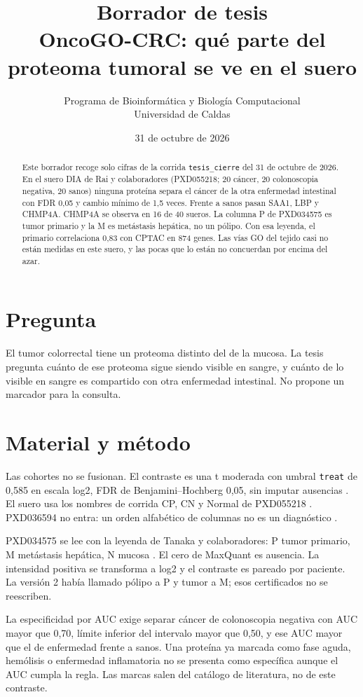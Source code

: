 \documentclass[11pt]{article}
\title{Borrador de tesis\\OncoGO-CRC: qué parte del proteoma tumoral se ve en el suero}
\author{Programa de Bioinformática y Biología Computacional\\Universidad de Caldas}
\date{31 de octubre de 2026}
\begin{document}
\maketitle
\begin{abstract}
Este borrador recoge solo cifras de la corrida \texttt{tesis\_cierre} del 31 de octubre de 2026. En el suero DIA de Rai y colaboradores (PXD055218; 20 cáncer, 20 colonoscopia negativa, 20 sanos) ninguna proteína separa el cáncer de la otra enfermedad intestinal con FDR 0,05 y cambio mínimo de 1,5 veces. Frente a sanos pasan SAA1, LBP y CHMP4A. CHMP4A se observa en 16 de 40 sueros. La columna P de PXD034575 es tumor primario y la M es metástasis hepática, no un pólipo. Con esa leyenda, el primario correlaciona 0,83 con CPTAC en 874 genes. Las vías GO del tejido casi no están medidas en este suero, y las pocas que lo están no concuerdan por encima del azar.
\end{abstract}

\section{Pregunta}
El tumor colorrectal tiene un proteoma distinto del de la mucosa. La tesis pregunta cuánto de ese proteoma sigue siendo visible en sangre, y cuánto de lo visible en sangre es compartido con otra enfermedad intestinal. No propone un marcador para la consulta.

\section{Material y método}
Las cohortes no se fusionan. El contraste es una t moderada con umbral \texttt{treat} de 0,585 en escala log2, FDR de Benjamini--Hochberg 0,05, sin imputar ausencias \cite{smyth2004,mccarthy2009}. El suero usa los nombres de corrida CP, CN y Normal de PXD055218 \cite{rai2025}. PXD036594 no entra: un orden alfabético de columnas no es un diagnóstico \cite{lesur2023}.

PXD034575 se lee con la leyenda de Tanaka y colaboradores: P tumor primario, M metástasis hepática, N mucosa \cite{tanaka2024}. El cero de MaxQuant es ausencia. La intensidad positiva se transforma a log2 y el contraste es pareado por paciente. La versión 2 había llamado pólipo a P y tumor a M; esos certificados no se reescriben.

La especificidad por AUC exige separar cáncer de colonoscopia negativa con AUC mayor que 0,70, límite inferior del intervalo mayor que 0,50, y ese AUC mayor que el de enfermedad frente a sanos. Una proteína ya marcada como fase aguda, hemólisis o enfermedad inflamatoria no se presenta como específica aunque el AUC cumpla la regla. Las marcas salen del catálogo de literatura, no de este contraste.
\end{document}
